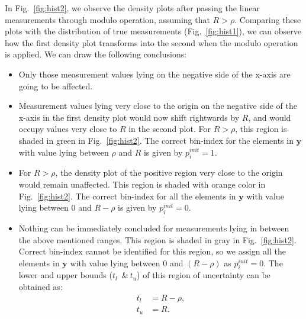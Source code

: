 In Fig.~\ref{fig:hist2}, we observe the density plots after passing the linear measurements through modulo operation, assuming that $R>\rho$. Comparing these plots with the distribution of true measurements (Fig.~\ref{fig:hist1}), we can observe how the first density plot transforms into the second when the modulo operation is applied. We can draw the following conclusions:

\begin{itemize}
	\item Only those measurement values lying on the negative side of the x-axis are going to be affected.
	\item Measurement values lying very close to the origin on the negative side of the x-axis in the first density plot would now shift rightwards by $R$, and would occupy values very close to $R$ in the second plot. For $R>\rho$, this region is shaded in green in Fig.~\ref{fig:hist2}. The correct bin-index for the elements in $\mathbf{y}$ with value lying between $\rho$ and $R$ is given by $p^{init}_{i} = 1$.
	\item For $R>\rho$, the density plot of the positive region very close to the origin would remain unaffected. This region is shaded with orange color in Fig.~\ref{fig:hist2}. The correct bin-index for all the elements in $\mathbf{y}$ with value lying between $0$ and $R-\rho$ is given by $p^{init}_{i} = 0$.
	\item Nothing can be immediately concluded for measurements lying in between the above mentioned ranges. This region is shaded in gray in Fig.~\ref{fig:hist2}. Correct bin-index cannot be identified for this region, so we assign all the elements in $\mathbf{y}$ with value lying between $0$ and $(R-\rho)$ as $p^{init}_{i} = 0$. The lower and upper bounds ($t_l$~\&$~t_u$) of this region of uncertainty can be obtained as:
	\begin{align*}
	t_l & = R-\rho, \\
	t_u & = R.
	\end{align*}
\end{itemize}

